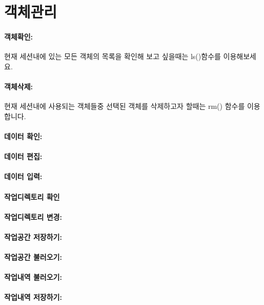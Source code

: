 \section{객체관리}

\paragraph{객체확인: }  현재 세션내에 있는 모든 객체의 목록을 확인해 보고 싶을때는 ls()함수를 이용해보세요.

\paragraph{객체삭제:} 현재 세션내에 사용되는 객체들중 선택된 객체를 삭제하고자 할때는 rm() 함수를 이용합니다.

\paragraph{데이터 확인:}

\paragraph{데이터 편집:}

\paragraph{데이터 입력:}

\paragraph{작업디렉토리 확인}
\paragraph{작업디렉토리 변경:}
\paragraph{작업공간 저장하기:}
\paragraph{작업공간 불러오기:}
\paragraph{작업내역 불러오기:}
\paragraph{작업내역 저장하기:}


